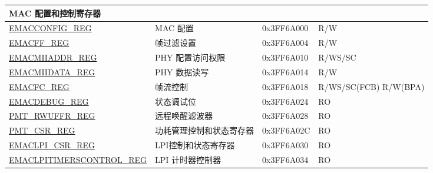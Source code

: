 \begin{longtable}{ |m{5cm} |m{6.3cm} | m{2cm} | m{2.2cm} | }
\multicolumn{4}{|l|}{\textbf{MAC 配置和控制寄存器}} \\ \hline
\hyperref[regdesc:EMACCONFIGREG]{EMACCONFIG\_REG} & MAC 配置& 0x3FF6A000 & R/W \\ \hline
\hyperref[regdesc:EMACFFREG]{EMACFF\_REG} & 帧过滤设置 & 0x3FF6A004 & R/W \\ \hline
\hyperref[regdesc:EMACMIIADDRREG]{EMACMIIADDR\_REG} & PHY 配置访问权限  & 0x3FF6A010 & R/WS/SC \\ \hline
\hyperref[regdesc:EMACMIIDATAREG]{EMACMIIDATA\_REG} & PHY 数据读写 & 0x3FF6A014 & R/W \\ \hline
\hyperref[regdesc:EMACFLOWCONTROLREG]{EMACFC\_REG} & 帧流控制& 0x3FF6A018 & R/WS/SC(FCB) R/W(BPA) \\ \hline
\hyperref[regdesc:EMACDEBUGREG]{EMACDEBUG\_REG} & 状态调试位& 0x3FF6A024 & RO \\ \hline
\hyperref[regdesc:PMT_RWUFFRREG]{PMT\_RWUFFR\_REG} & 远程唤醒滤波器 & 0x3FF6A028 & RO \\ \hline
\hyperref[regdesc:PMT_CSRREG]{PMT\_CSR\_REG} & 功耗管理控制和状态寄存器 & 0x3FF6A02C & RO \\ \hline
\hyperref[regdesc:EMACLPI_CSRREG]{EMACLPI\_CSR\_REG} & LPI控制和状态寄存器 & 0x3FF6A030 & RO \\ \hline
\hyperref[regdesc:EMACLPITIMERSCONTROLREG]{EMACLPITIMERSCONTROL\_REG} & LPI 计时器控制器 & 0x3FF6A034 & RO \\ \hline


\end{longtable}
